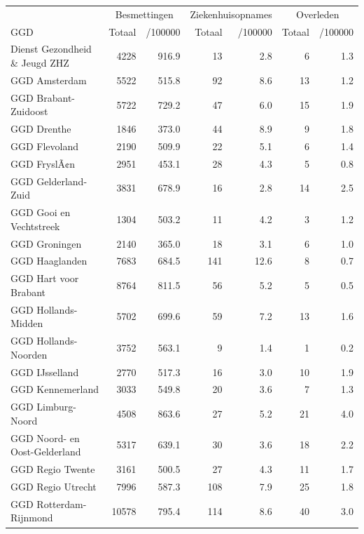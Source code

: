 \documentclass[
  english,
  man,floatsintext]{apa6}
\begin{document}
\begin{table}
\centering\begingroup\fontsize{10}{12}\selectfont

\begin{threeparttable}
\begin{tabular}{lrrrrrr}
\toprule
\multicolumn{1}{c}{ } & \multicolumn{2}{c}{Besmettingen} & \multicolumn{2}{c}{Ziekenhuisopnames} & \multicolumn{2}{c}{Overleden} \\
\cmidrule(l{3pt}r{3pt}){2-3} \cmidrule(l{3pt}r{3pt}){4-5} \cmidrule(l{3pt}r{3pt}){6-7}
GGD & Totaal & /100000 & Totaal & /100000 & Totaal & /100000\\
\midrule
Dienst Gezondheid \& Jeugd ZHZ & 4228 & 916.9 & 13 & 2.8 & 6 & 1.3\\
GGD Amsterdam & 5522 & 515.8 & 92 & 8.6 & 13 & 1.2\\
GGD Brabant-Zuidoost & 5722 & 729.2 & 47 & 6.0 & 15 & 1.9\\
GGD Drenthe & 1846 & 373.0 & 44 & 8.9 & 9 & 1.8\\
GGD Flevoland & 2190 & 509.9 & 22 & 5.1 & 6 & 1.4\\
GGD FryslÃ¢n & 2951 & 453.1 & 28 & 4.3 & 5 & 0.8\\
GGD Gelderland-Zuid & 3831 & 678.9 & 16 & 2.8 & 14 & 2.5\\
GGD Gooi en Vechtstreek & 1304 & 503.2 & 11 & 4.2 & 3 & 1.2\\
GGD Groningen & 2140 & 365.0 & 18 & 3.1 & 6 & 1.0\\
GGD Haaglanden & 7683 & 684.5 & 141 & 12.6 & 8 & 0.7\\
GGD Hart voor Brabant & 8764 & 811.5 & 56 & 5.2 & 5 & 0.5\\
GGD Hollands-Midden & 5702 & 699.6 & 59 & 7.2 & 13 & 1.6\\
GGD Hollands-Noorden & 3752 & 563.1 & 9 & 1.4 & 1 & 0.2\\
GGD IJsselland & 2770 & 517.3 & 16 & 3.0 & 10 & 1.9\\
GGD Kennemerland & 3033 & 549.8 & 20 & 3.6 & 7 & 1.3\\
GGD Limburg-Noord & 4508 & 863.6 & 27 & 5.2 & 21 & 4.0\\
GGD Noord- en Oost-Gelderland & 5317 & 639.1 & 30 & 3.6 & 18 & 2.2\\
GGD Regio Twente & 3161 & 500.5 & 27 & 4.3 & 11 & 1.7\\
GGD Regio Utrecht & 7996 & 587.3 & 108 & 7.9 & 25 & 1.8\\
GGD Rotterdam-Rijnmond & 10578 & 795.4 & 114 & 8.6 & 40 & 3.0\\

\end{tabular}
\end{threeparttable}
\end{table}
\end{document}

